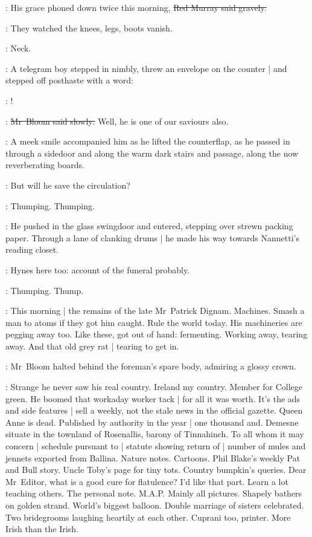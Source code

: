 
\redmurray:
His grace phoned down twice this morning,
\sout{Red Murray said gravely.}

:
They watched the knees, legs, boots vanish.

\BloomInt:
Neck.

:
A telegram boy stepped in nimbly,
threw an envelope on the counter |
and stepped off posthaste with a word:

\boy:
!

\Bloom:
\sout{Mr~Bloom said slowly:}
Well, he is one of our saviours also.

:
A meek smile accompanied him
as he lifted the counterflap,
as he passed in through a sidedoor
and along the warm dark stairs and passage,
along the now reverberating boards.

\BloomInt:
But will he save the circulation?

:
Thumping.
Thumping.

:
He pushed in the glass swingdoor and entered,
stepping over strewn packing paper.
Through a lane of clanking drums |
he made his way towards Nannetti's reading closet.

\BloomInt:
Hynes here too:
account of the funeral probably.

:
Thumping.
Thump.



\BloomInt:
This morning |
the remains of the late Mr~Patrick Dignam.
Machines.
Smash a man to atoms if they got him caught.
Rule the world today.
His machineries are pegging away too.
Like these, got out of hand:
fermenting.
Working away, tearing away.
And that old grey rat |
tearing to get in.



:
Mr~Bloom halted behind the foreman's spare body,
admiring a glossy crown.

\BloomInt:
Strange he never saw his real country.
Ireland my country.
Member for College green.
He boomed that workaday worker tack |
for all it was worth.
It's the ads and side features |
sell a weekly,
not the stale news in the official gazette.
Queen Anne is dead.
Published by authority in the year |
one thousand and.
Demesne situate in the townland of Rosenallis,
barony of Tinnahinch.
To all whom it may concern |
schedule pursuant to |
statute showing return of |
number of mules and jennets exported from Ballina.
Nature notes.
Cartoons.
Phil Blake's weekly Pat and Bull story.
Uncle Toby's page for tiny tots.
Country bumpkin's queries.
Dear Mr~Editor, what is a good cure for flatulence?
I'd like that part.
Learn a lot teaching others.
The personal note.
M.A.P. Mainly all pictures.
Shapely bathers on golden strand.
World's biggest balloon.
Double marriage of sisters celebrated.
Two bridegrooms laughing heartily at each other.
Cuprani too, printer.
More Irish than the Irish.

